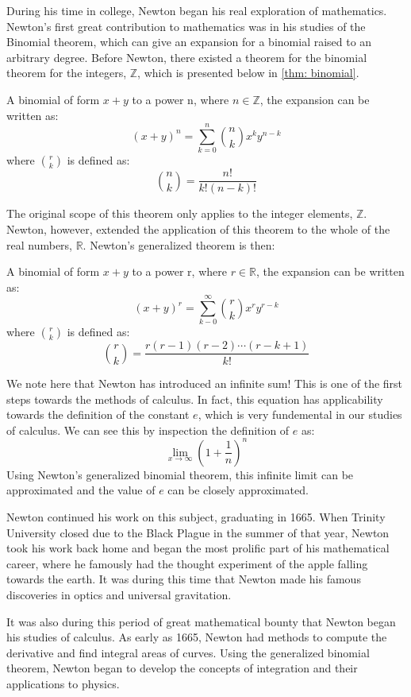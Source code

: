 During his time in college, Newton began his real exploration of mathematics. Newton's first great contribution to mathematics was in his studies of the Binomial theorem, which can give an expansion for a binomial raised to an arbitrary degree. Before Newton, there existed a theorem for the binomial theorem for the integers, $\mathbb{Z}$, which is presented below in \autoref{thm: binomial}.

\begin{theorem}\label{thm: binomial}
    A binomial of form $x+y$ to a power n, where $n\in\mathbb{Z}$, the expansion can be written as:
    $$(x+y)^n=\sum_{k=0}^{n}\binom{n} {k}x^ky^{n-k}$$
    where $\binom{r}{k}$ is defined as:
    $$\binom{n}{k}=\frac{n!}{k!(n-k)!}$$
\end{theorem}

The original scope of this theorem only applies to the integer elements, $\mathbb{Z}$. Newton, however, extended the application of this theorem to the whole of the real numbers, $\mathbb{R}$. Newton's generalized theorem is then:


\begin{theorem}
    A binomial of form $x+y$ to a power r, where $r\in\mathbb{R}$, the expansion can be written as:
    $$(x+y)^r=\sum_{k-0}^{\infty}\binom{r} {k}x^ry^{r-k}$$
    where $\binom{r}{k}$ is defined as:
    $$\binom{r}{k}=\frac{r(r-1)(r-2)\cdots(r-k+1)}{k!}$$
\end{theorem}

We note here that Newton has introduced an infinite sum! This is one of the first steps towards the methods of calculus. In fact, this equation has applicability towards the definition of the constant $e$, which is very fundemental in our studies of calculus. We can see this by inspection the definition of $e$ as:
$$ \lim_{x\to\infty} \left(1+\frac{1}{n}\right)^n$$
Using Newton's generalized binomial theorem, this infinite limit can be approximated and the value of $e$ can be closely approximated.

Newton continued his work on this subject, graduating in 1665. When Trinity University closed due to the Black Plague in the summer of that year, Newton took his work back home and began the most prolific part of his mathematical career, where he famously had the thought experiment of the apple falling towards the earth. It was during this time that Newton made his famous discoveries in optics and universal gravitation.

It was also during this period of great mathematical bounty that Newton began his studies of calculus. As early as 1665, Newton had methods to compute the derivative and find integral areas of curves. Using the generalized binomial theorem, Newton began to develop the concepts of integration and their applications to physics.

